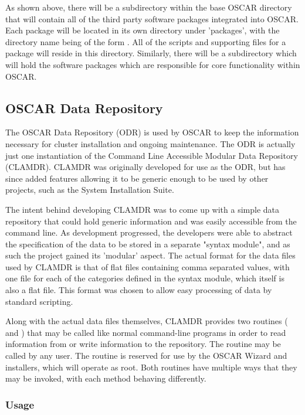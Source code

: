 As shown above, there will be a  subdirectory within
the base OSCAR directory that will contain all of the third party
software packages integrated into OSCAR. Each package will be located
in its own directory under 'packages', with the directory name being
of the form . All of the scripts and supporting files
for a package will reside in this directory.  Similarly, there will be
a  subdirectory which will hold the software
packages which are responsible for core functionality within OSCAR.

\subsection{OSCAR Data Repository}

The OSCAR Data Repository (ODR) is used by OSCAR to keep the
information necessary for cluster installation and ongoing
maintenance. The ODR is actually just one instantiation of the Command
Line Accessible Modular Data Repository (CLAMDR). CLAMDR was
originally developed for use as the ODR, but has since added features
allowing it to be generic enough to be used by other projects, such as
the System Installation Suite.

The intent behind developing CLAMDR was to come up with a simple data
repository that could hold generic information and was easily
accessible from the command line. As development progressed, the
developers were able to abstract the specification of the data to be
stored in a separate "syntax module", and as such the project gained
its 'modular' aspect. The actual format for the data files used by
CLAMDR is that of flat files containing comma separated values, with
one file for each of the categories defined in the syntax module,
which itself is also a flat file.  This format was chosen to allow
easy processing of data by standard scripting.

Along with the actual data files themselves, CLAMDR provides two
routines ( and ) that may be called
like normal command-line programs in order to read information from or
write information to the repository. The  routine may
be called by any user. The  routine is reserved for
use by the OSCAR Wizard and installers, which will operate as root.
Both routines have multiple ways that they may be invoked, with each
method behaving differently.

\subsubsection{ Usage}

